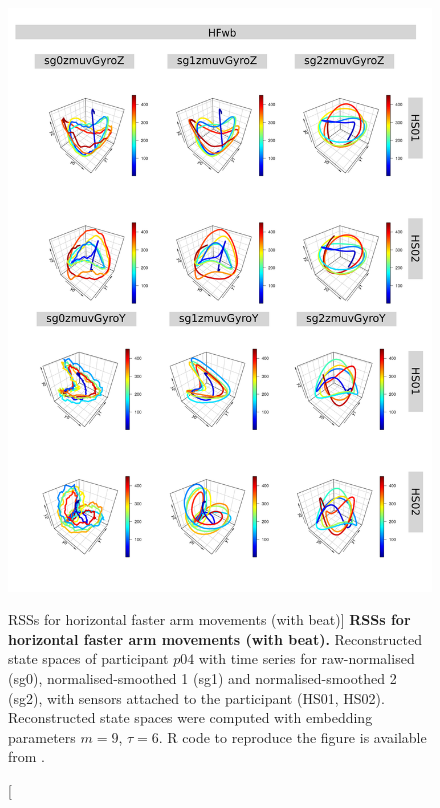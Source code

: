 \begin{figure}
\centering
\includegraphics[height=0.8\textheight]{rss_HFwb_p04}
\caption
	[RSSs for horizontal faster arm movements (with beat)]{
	{\bf RSSs for horizontal faster arm movements (with beat).}
	Reconstructed state spaces of participant $p04$
	with time series for raw-normalised (sg0), 
	normalised-smoothed 1 (sg1) and 
	normalised-smoothed 2 (sg2), 
	with sensors attached to the participant (HS01, HS02).
	Reconstructed state spaces were computed with 
	embedding parameters $m=9$, $\tau=6$.
	R code to reproduce the figure is available from \cite{hwum2018}.
        }
     \label{fig:rss_HFwb_p04}
\end{figure}






